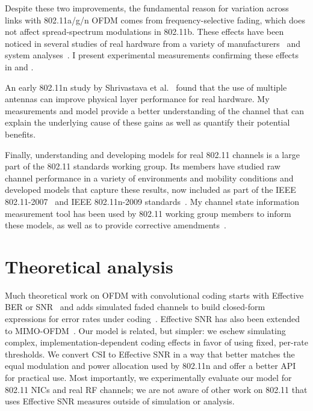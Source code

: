 Despite these two improvements, the fundamental reason for variation across links with 802.11a/g/n OFDM comes from frequency-selective fading, which does not affect spread-spectrum modulations in 802.11b. These effects have been noticed in several studies of real hardware from a variety of manufacturers~\cite{Han_errors,Miu_MRD} and system analyses~\cite{Lampe_adaptation,Tse}. I present experimental measurements confirming these effects in  and .

An early 802.11n study by Shrivastava et al.~\cite{Shrivastava_80211n} found that the use of multiple antennas can improve physical layer performance for real hardware. My measurements and model provide a better understanding of the channel that can explain the underlying cause of these gains as well as quantify their potential benefits.

Finally, understanding and developing models for real 802.11 channels is a large part of the 802.11 standards working group. Its members have studied raw channel performance in a variety of environments and mobility conditions and developed models that capture these results, now included as part of the IEEE 802.11-2007~\cite{80211} and IEEE 802.11n-2009 standards~\cite{80211n}. My channel state information measurement tool has been used by 802.11 working group members to inform these models, as well as to provide corrective amendments~\cite{Perahia_Doppler}.

\section{Theoretical analysis}
Much theoretical work on OFDM with convolutional coding starts with Effective BER or SNR~\cite{Nanda_EffectiveSNR} and adds simulated faded channels to build closed-form expressions for error rates under coding~\cite{Awoniyi_ofdm,Nortel_3g,Tralli_convolutional}. Effective SNR has also been extended to MIMO-OFDM~\cite{Liu_EESM,Martorell_11n,Kant_FLA}. Our model is related, but simpler: we eschew simulating complex, implementation-dependent coding effects in favor of using fixed, per-rate thresholds. We convert CSI to Effective SNR in a way that better matches the equal modulation and power allocation used by 802.11n and offer a better API for practical use. Most importantly, we experimentally evaluate our model for 802.11 NICs and real RF channels; we are not aware of other work on 802.11 that uses Effective SNR measures outside of simulation or analysis.

